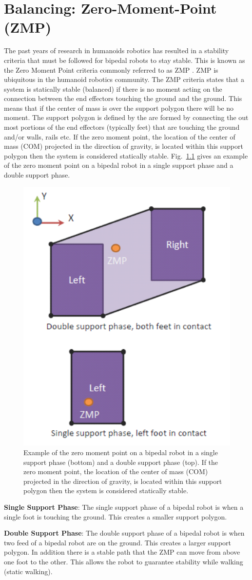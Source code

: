 \chapter{Balancing: Zero-Moment-Point (ZMP)}\label{sec:zmp}
The past years of research in humanoids robotics has resulted in a stability criteria that must be followed for bipedal robots to stay stable.
This is known as the Zero Moment Point criteria commonly referred to as ZMP \cite{zmp35}.
ZMP is ubiquitous in the humanoid robotics community.
The ZMP criteria states that a system is statically stable (balanced) if there is no moment acting on the connection between the end effectors touching the ground and the ground.
This means that if the center of mass is over the support polygon there will be no moment.
The support polygon is defined by the are formed by connecting the out most portions of the end effectors (typically feet) that are touching the ground and/or walls, rails etc. 
If the zero moment point, the location of the center of mass (COM) projected in the direction of gravity, is located within this support polygon then the system is considered statically stable.
Fig.~\ref{fig:zmp} gives an example of the zero moment point on a bipedal robot in a single support phase and a double support phase.


\begin{figure}[thpb]
  \centering
\includegraphics[width=0.5\columnwidth]{./background/pix/zmp.png}
  \caption{Example of the zero moment point on a bipedal robot in a single support phase (bottom) and a double support phase (top).  
If the zero moment point, the location of the center of mass (COM) projected in the direction of gravity, is located within this support polygon then the system is considered statically stable.}
  \label{fig:zmp}
\end{figure}

\noindent \textbf{Single Support Phase}:
The single support phase of a bipedal robot is when a single foot is touching the ground.
This creates a smaller support polygon.

\noindent \textbf{Double Support Phase}:
The double support phase of a bipedal robot is when two feed of a bipedal robot are on the ground.
This creates a larger support polygon.  
In addition there is a stable path that the ZMP can move from above one foot to the other.
This allows the robot to guarantee stability while walking (static walking).

